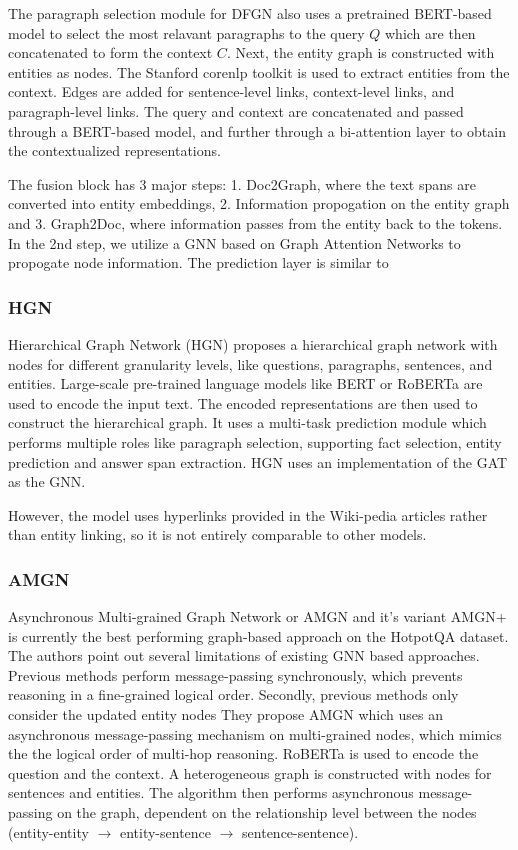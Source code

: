 \documentclass[sigplan,screen]{acmart}
\begin{document}
The paragraph selection module for DFGN also uses a pretrained BERT-based model \cite{RN153} to select the most relavant paragraphs to the 
query $Q$ which are then concatenated to form the context $C$. Next, the entity graph is constructed with entities as nodes. The Stanford 
corenlp toolkit \cite{RN170} is used to extract entities from the context. Edges are added for sentence-level links, context-level links, 
and paragraph-level links. The query and context are concatenated and passed through a BERT-based model, and further through a bi-attention 
layer to obtain the contextualized representations.

The fusion block has 3 major steps: 1. Doc2Graph, where the text spans are converted into entity embeddings, 2. Information propogation on 
the entity graph and 3. Graph2Doc, where information passes from the entity back to the tokens. In the 2nd step, we utilize a GNN based on 
Graph Attention Networks \cite{RN7} to propogate node information. The prediction layer is similar to \cite{RN116}

\subsubsection{HGN}
Hierarchical Graph Network (HGN) \cite{RN119} proposes a hierarchical graph network with nodes for different granularity levels, like questions, 
paragraphs, sentences, and entities. Large-scale pre-trained language models like BERT \cite{RN153} or RoBERTa \cite{RN171} are used to encode 
the input text. The encoded representations are then used to construct the hierarchical graph. It uses a multi-task prediction module which 
performs multiple roles like paragraph selection, supporting fact selection, entity prediction and answer span extraction. HGN uses an 
implementation of the GAT \cite{RN7} as the GNN.

However, the model uses hyperlinks provided in the Wiki-pedia articles rather than entity linking, so it is not entirely comparable to other 
models.

\subsubsection{AMGN}
Asynchronous Multi-grained Graph Network \cite{RN131} or AMGN and it's variant AMGN+ is currently the best performing graph-based approach on the HotpotQA dataset.
The authors point out several limitations of existing GNN based approaches. Previous methods perform message-passing synchronously,
which prevents reasoning in a fine-grained logical order. Secondly, previous methods only consider the  updated entity nodes
They propose AMGN which uses an asynchronous message-passing mechanism on multi-grained nodes, which mimics the the logical order of multi-hop 
reasoning. RoBERTa \cite{RN171} is used to encode the question and the context. A heterogeneous graph is constructed with nodes for sentences 
and entities. The algorithm then performs asynchronous message-passing on the graph, dependent on the relationship level between the nodes 
(entity-entity $\to$ entity-sentence $\to$ sentence-sentence).
\end{document}
